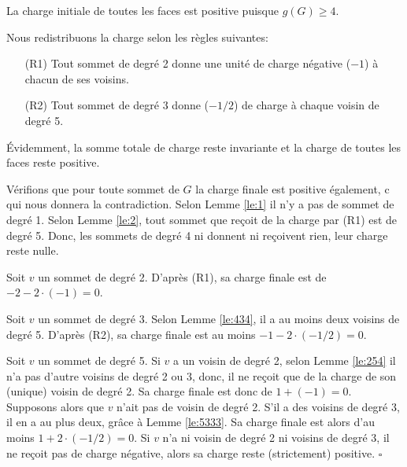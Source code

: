 \documentclass[10pt,a4paper]{article}
\newcommand{\ep}{{\hfill $\square$}}
\begin{document}
La charge initiale de toutes les faces est positive puisque $g(G)\ge 4$.

Nous redistribuons la charge selon les règles suivantes:
\begin{enumerate}
\item[(R1)] Tout sommet de degré 2 donne une unité de charge négative ($-1$) à chacun de ses voisins.
\item[(R2)] Tout sommet de degré 3 donne ($-1/2$) de charge à chaque voisin de degré 5.
\end{enumerate}

Évidemment, la somme totale de charge reste invariante et la charge de toutes les faces reste positive.

Vérifions que pour toute sommet de $G$ la charge finale est positive également, c qui nous donnera la contradiction.
Selon Lemme \ref{le:1} il n'y a pas de sommet de degré 1.
Selon Lemme \ref{le:2}, tout sommet que reçoit de la charge par (R1) est de degré 5. Donc, les sommets de degré 4 ni donnent ni reçoivent rien, leur charge reste nulle.

Soit $v$ un sommet de degré 2. D'après (R1), sa charge finale est de $-2 - 2\cdot (-1)=0$.

Soit $v$ un sommet de degré 3. Selon Lemme \ref{le:434}, il a au moins deux voisins de degré 5. D'après (R2), sa charge finale est au moins $-1 - 2\cdot (-1/2) = 0$.

Soit $v$ un sommet de degré 5. Si $v$ a un voisin de degré 2, selon Lemme \ref{le:254} il n'a pas d'autre voisins de degré 2 ou 3, donc, il ne reçoit que de la charge de son (unique) voisin de degré 2. Sa charge finale est donc de $1+(-1)=0$.
Supposons alors que $v$ n'ait pas de voisin de degré 2. S'il a des voisins de degré 3, il en a au plus deux, grâce à Lemme \ref{le:5333}. Sa charge finale est alors d'au moins $1+2\cdot(-1/2) = 0$. Si $v$ n'a ni voisin de degré 2 ni voisins de degré 3, il ne reçoit pas de charge négative, alors sa charge reste (strictement) positive.
\ep


\end{document}
